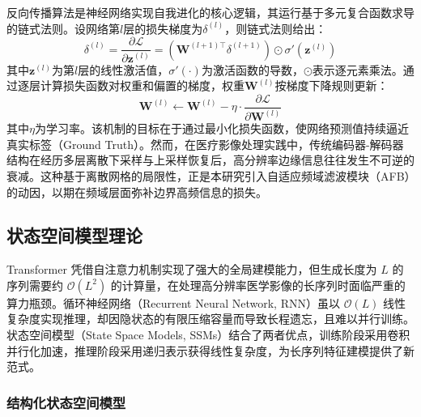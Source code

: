 \documentclass[12pt, a4paper, twoside]{article}
\begin{document}
反向传播算法是神经网络实现自我进化的核心逻辑，其运行基于多元复合函数求导的链式法则。设网络第$l$层的损失梯度为$\delta^{(l)}$，则链式法则给出：
\begin{equation}
\delta^{(l)} = \frac{\partial \mathcal{L}}{\partial \mathbf{z}^{(l)}} = \left(\mathbf{W}^{(l+1)\top} \delta^{(l+1)}\right) \odot \sigma'\!\left(\mathbf{z}^{(l)}\right)
\end{equation}
其中$\mathbf{z}^{(l)}$为第$l$层的线性激活值，$\sigma'(\cdot)$为激活函数的导数，$\odot$表示逐元素乘法。通过逐层计算损失函数对权重和偏置的梯度，权重$\mathbf{W}^{(l)}$按梯度下降规则更新：
\begin{equation}
\mathbf{W}^{(l)} \leftarrow \mathbf{W}^{(l)} - \eta \cdot \frac{\partial \mathcal{L}}{\partial \mathbf{W}^{(l)}}
\end{equation}
其中$\eta$为学习率。该机制的目标在于通过最小化损失函数，使网络预测值持续逼近真实标签（Ground Truth）。然而，在医疗影像处理实践中，传统编码器-解码器结构在经历多层离散下采样与上采样恢复后，高分辨率边缘信息往往发生不可逆的衰减。这种基于离散网格的局限性，正是本研究引入自适应频域滤波模块（AFB）的动因，以期在频域层面弥补边界高频信息的损失。



\subsection{状态空间模型理论}

Transformer 凭借自注意力机制实现了强大的全局建模能力，但生成长度为 $L$ 的序列需要约 $\mathcal{O}(L^2)$ 的计算量，在处理高分辨率医学影像的长序列时面临严重的算力瓶颈。循环神经网络（Recurrent Neural Network, RNN）虽以 $\mathcal{O}(L)$ 线性复杂度实现推理，却因隐状态的有限压缩容量而导致长程遗忘，且难以并行训练。状态空间模型（State Space Models, SSMs）结合了两者优点，训练阶段采用卷积并行化加速，推理阶段采用递归表示获得线性复杂度，为长序列特征建模提供了新范式。

\subsubsection{结构化状态空间模型}
\end{document}
